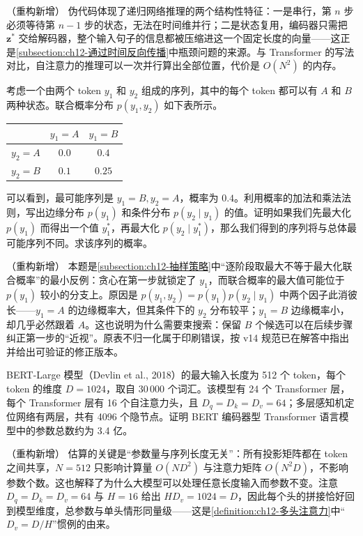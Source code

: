 \documentclass[../../main.tex]{subfiles}
\begin{document}
\begin{remark}（重构新增）
伪代码体现了递归网络推理的两个结构性特征：一是串行，第 $n$ 步必须等待第 $n-1$ 步的状态，无法在时间维并行；二是状态复用，编码器只需把 $\mathbf{z}^{*}$ 交给解码器，整个输入句子的信息都被压缩进这一个固定长度的向量——这正是\cref{subsection:ch12-通过时间反向传播}中瓶颈问题的来源。与 Transformer 的写法对比，自注意力的推理可以一次并行算出全部位置，代价是 $O(N^{2})$ 的内存。
\end{remark}

\begin{exercise}\label{exercise:ch12-15}
考虑一个由两个 token $y_1$ 和 $y_2$ 组成的序列，其中的每个 token 都可以有 $A$ 和 $B$ 两种状态。联合概率分布 $p(y_1,y_2)$ 如下表所示。

\begin{center}
\begin{tabular}{c|cc}
 & $y_1=A$ & $y_1=B$\\\hline
$y_2=A$ & $0.0$ & $0.4$\\
$y_2=B$ & $0.1$ & $0.25$
\end{tabular}
\end{center}

可以看到，最可能序列是 $y_1=B,y_2=A$，概率为 $0.4$。利用概率的加法和乘法法则，写出边缘分布 $p(y_1)$ 和条件分布 $p(y_2\mid y_1)$ 的值。证明如果我们先最大化 $p(y_1)$ 而得出一个值 $y_1^{*}$，再最大化 $p(y_2\mid y_1^{*})$，那么我们得到的序列将与总体最可能序列不同。求该序列的概率。
\end{exercise}

\begin{remark}（重构新增）
本题是\cref{subsection:ch12-抽样策略}中“逐阶段取最大不等于最大化联合概率”的最小反例：贪心在第一步就锁定了 $y_1$，而联合概率的最大值可能位于 $p(y_1)$ 较小的分支上。原因是 $p(y_1,y_2)=p(y_1)p(y_2\mid y_1)$ 中两个因子此消彼长——$y_1=A$ 的边缘概率大，但其条件下的 $y_2$ 分布较平；$y_1=B$ 边缘概率小，却几乎必然跟着 $A$。这也说明为什么需要束搜索：保留 $B$ 个候选可以在后续步骤纠正第一步的“近视”。原表不归一化属于印刷错误，按 v14 规范已在解答中指出并给出可验证的修正版本。
\end{remark}

\begin{exercise}[（$\star$）]\label{exercise:ch12-16}
BERT-Large 模型（Devlin et al., 2018）的最大输入长度为 512 个 token，每个 token 的维度 $D=1024$，取自 30\,000 个词汇。该模型有 24 个 Transformer 层，每个 Transformer 层有 16 个自注意力头，且 $D_q=D_k=D_v=64$；多层感知机定位网络有两层，共有 4096 个隐节点。证明 BERT 编码器型 Transformer 语言模型中的参数总数约为 3.4 亿。
\end{exercise}

\begin{remark}（重构新增）
估算的关键是“参数量与序列长度无关”：所有投影矩阵都在 token 之间共享，$N=512$ 只影响计算量 $O(ND^{2})$ 与注意力矩阵 $O(N^{2}D)$，不影响参数个数。这也解释了为什么大模型可以处理任意长度输入而参数不变。注意 $D_q=D_k=D_v=64$ 与 $H=16$ 给出 $HD_v=1024=D$，因此每个头的拼接恰好回到模型维度，总参数与单头情形同量级——这是\cref{definition:ch12-多头注意力}中“$D_v=D/H$”惯例的由来。
\end{remark}
\end{document}
